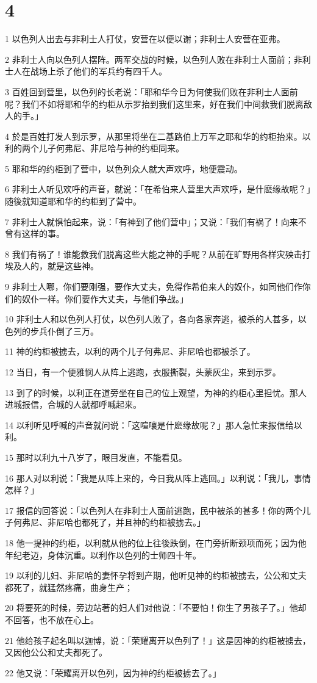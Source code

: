 \chapter{4}

\par 1 以色列人出去与非利士人打仗，安营在以便以谢；非利士人安营在亚弗。
\par 2 非利士人向以色列人摆阵。两军交战的时候，以色列人败在非利士人面前；非利士人在战场上杀了他们的军兵约有四千人。
\par 3 百姓回到营里，以色列的长老说：「耶和华今日为何使我们败在非利士人面前呢？我们不如将耶和华的约柜从示罗抬到我们这里来，好在我们中间救我们脱离敌人的手。」
\par 4 於是百姓打发人到示罗，从那里将坐在二基路伯上万军之耶和华的约柜抬来。以利的两个儿子何弗尼、非尼哈与神的约柜同来。
\par 5 耶和华的约柜到了营中，以色列众人就大声欢呼，地便震动。
\par 6 非利士人听见欢呼的声音，就说：「在希伯来人营里大声欢呼，是什麽缘故呢？」随後就知道耶和华的约柜到了营中。
\par 7 非利士人就惧怕起来，说：「有神到了他们营中」；又说：「我们有祸了！向来不曾有这样的事。
\par 8 我们有祸了！谁能救我们脱离这些大能之神的手呢？从前在旷野用各样灾殃击打埃及人的，就是这些神。
\par 9 非利士人哪，你们要刚强，要作大丈夫，免得作希伯来人的奴仆，如同他们作你们的奴仆一样。你们要作大丈夫，与他们争战。」
\par 10 非利士人和以色列人打仗，以色列人败了，各向各家奔逃，被杀的人甚多，以色列的步兵仆倒了三万。
\par 11 神的约柜被掳去，以利的两个儿子何弗尼、非尼哈也都被杀了。
\par 12 当日，有一个便雅悯人从阵上逃跑，衣服撕裂，头蒙灰尘，来到示罗。
\par 13 到了的时候，以利正在道旁坐在自己的位上观望，为神的约柜心里担忧。那人进城报信，合城的人就都呼喊起来。
\par 14 以利听见呼喊的声音就问说：「这喧嚷是什麽缘故呢？」那人急忙来报信给以利。
\par 15 那时以利九十八岁了，眼目发直，不能看见。
\par 16 那人对以利说：「我是从阵上来的，今日我从阵上逃回。」以利说：「我儿，事情怎样？」
\par 17 报信的回答说：「以色列人在非利士人面前逃跑，民中被杀的甚多！你的两个儿子何弗尼、非尼哈也都死了，并且神的约柜被掳去。」
\par 18 他一提神的约柜，以利就从他的位上往後跌倒，在门旁折断颈项而死；因为他年纪老迈，身体沉重。以利作以色列的士师四十年。
\par 19 以利的儿妇、非尼哈的妻怀孕将到产期，他听见神的约柜被掳去，公公和丈夫都死了，就猛然疼痛，曲身生产；
\par 20 将要死的时候，旁边站著的妇人们对他说：「不要怕！你生了男孩子了。」他却不回答，也不放在心上。
\par 21 他给孩子起名叫以迦博，说：「荣耀离开以色列了！」这是因神的约柜被掳去，又因他公公和丈夫都死了。
\par 22 他又说：「荣耀离开以色列，因为神的约柜被掳去了。」


